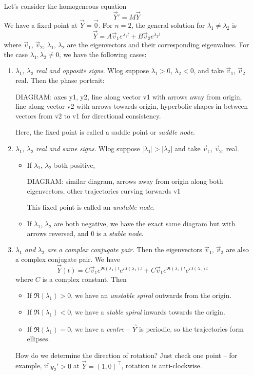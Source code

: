 \documentclass{../template/note}
\begin{document}
    Let's consider the homogeneous equation
    \[
        \vec Y' = M \vec Y
    \]
    We have a fixed point at \(\vec Y = \vec 0\). For \(n = 2\), the general solution for \(\lambda_1 \neq \lambda_2\) is
    \[
        \vec Y = A \vec v_1 e^{\lambda_1t} + B \vec v_2 e^{\lambda_2 t}
    \]
    where \(\vec v_1\), \(\vec v_2\), \(\lambda_1\), \(\lambda_2\) are the eigenvectors and their corresponding eigenvalues. For the case \(\lambda_1, \lambda_2 \neq 0\), we have the following cases:
    \begin{enumerate}[label=\protect\circled{\arabic*}]
        \item \emph{\(\lambda_1\), \(\lambda_2\) real and opposite signs}. Wlog suppose \(\lambda_1 > 0\), \(\lambda_2 < 0\), and take \(\vec v_1\), \(\vec v_2\) real. Then the phase portrait:

        DIAGRAM: axes y1, y2, line along vector v1 with arrows away from origin, line along vector v2 with arrows towards origin, hyperbolic shapes in between vectors from v2 to v1 for directional consistency.

        Here, the fixed point is called a saddle point or \emph{saddle node}.
        \item \emph{\(\lambda_1\), \(\lambda_2\) real and same signs}. Wlog suppose \(|\lambda_1|>|\lambda_2|\) and take \(\vec v_1\), \(\vec v_2\), real.
        \begin{itemize}
            \item If \(\lambda_1\), \(\lambda_2\) both positive,
            
            DIAGRAM: similar diagram, arrows away from origin along both eigenvectors, other trajectories curving torwards v1

            This fixed point is called an \emph{unstable node}.
            \item If \(\lambda_1\), \(\lambda_2\) are both negative, we have the exact same diagram but with arrows reversed, and 0 is a \emph{stable node}.
        \end{itemize}
        \item \emph{\(\lambda_1\) and \(\lambda_2\) are a complex conjugate pair}. Then the eigenvectors \(\vec v_1\), \(\vec v_2\) are also a complex conjugate pair. We have
        \[
            \vec Y(t) = C \vec v_1 e^{\Re(\lambda_1)t}e^{i\Im(\lambda_1)t} + \overline{C \vec v_1 e^{\Re(\lambda_1)t}e^{i\Im(\lambda_1)t}}
        \]
        where \(C\) is a complex constant. Then
        \begin{itemize}
            \item If \(\Re(\lambda_1) > 0\), we have an \emph{unstable spiral} outwards from the origin.
            \item If \(\Re(\lambda_1) < 0\), we have a \emph{stable spiral} inwards towards the origin.
            \item If \(\Re(\lambda_1) = 0\), we have a \emph{centre} -- \(\vec Y\) is periodic, so the trajectories form ellipses.
        \end{itemize}
        How do we determine the direction of rotation? Just check one point -- for example, if \(y_2' > 0\) at \(\vec Y = (1, 0)^\intercal\), rotation is anti-clockwise.
    \end{enumerate}
\end{document}
